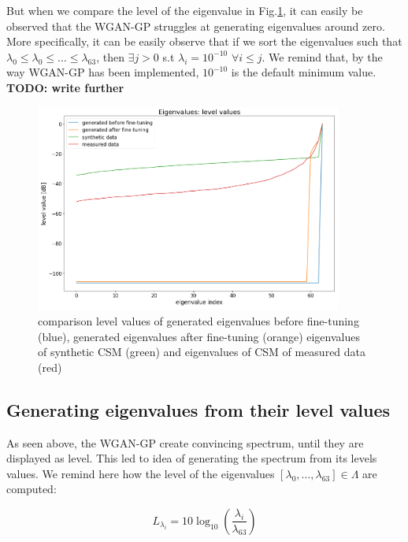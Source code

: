 \documentclass{article}
\begin{document}
But when we compare the level of the eigenvalue in Fig.\ref{fig:eval_WGANGP_sample_level}, it can easily be observed that the WGAN-GP struggles at generating eigenvalues around zero. More specifically, it can be easily observe that if we sort the eigenvalues such that $\lambda_0 \leq \lambda_0 \leq  \dots \leq \lambda_{63}$, then $\exists j>0$ s.t $\lambda_i = 10^{-10}$ $\forall i \leq j$. We remind that, by the way WGAN-GP has been implemented, $10^{-10}$ is the default minimum value. \textbf{TODO: write further}

\begin{figure}
    \centering
    \includegraphics[width=0.9\textwidth]{../figs/eval_WGANGP_sample_level.png}    
    \caption{comparison level values of generated eigenvalues before fine-tuning (blue), generated eigenvalues after fine-tuning (orange) eigenvalues of synthetic CSM (green) and eigenvalues of CSM of measured data (red)}
    \label{fig:eval_WGANGP_sample_level}
\end{figure} 


\subsection{Generating eigenvalues from their level values}

As seen above, the WGAN-GP create convincing spectrum, until they are displayed as level. This led to idea of generating the spectrum from its levels values. We remind here how the level of the eigenvalues $[\lambda_0, \dots, \lambda_{63}] \in \Lambda$ are computed:

\begin{equation}
    L_{\lambda_i} = 10 \log_{10}(\frac{\lambda_i}{\lambda_{63}})
\end{equation}
\end{document}
